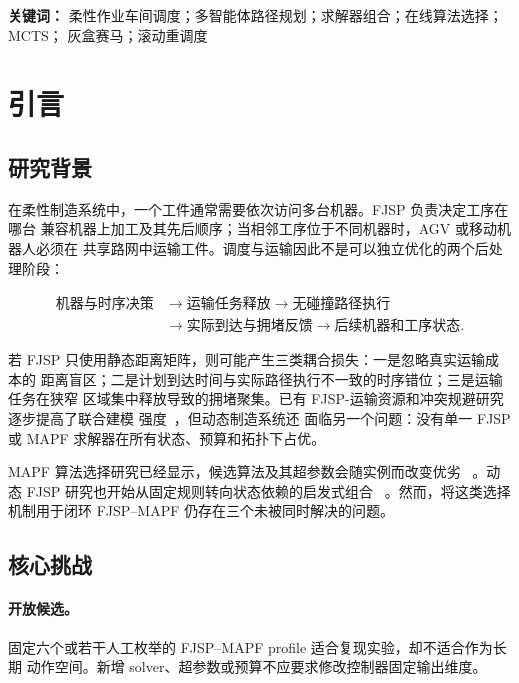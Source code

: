 \documentclass[11pt,a4paper]{article}
\begin{document}
\noindent\textbf{关键词：}
柔性作业车间调度；多智能体路径规划；求解器组合；在线算法选择；MCTS；
灰盒赛马；滚动重调度

\section{引言}
\label{sec:introduction}

\subsection{研究背景}

在柔性制造系统中，一个工件通常需要依次访问多台机器。FJSP 负责决定工序在哪台
兼容机器上加工及其先后顺序；当相邻工序位于不同机器时，AGV 或移动机器人必须在
共享路网中运输工件。调度与运输因此不是可以独立优化的两个后处理阶段：

\begin{equation}
\begin{aligned}
    \text{机器与时序决策}
    &\rightarrow
    \text{运输任务释放}
    \rightarrow
    \text{无碰撞路径执行}\\
    &\rightarrow
    \text{实际到达与拥堵反馈}
    \rightarrow
    \text{后续机器和工序状态}.
\end{aligned}
\end{equation}

若 FJSP 只使用静态距离矩阵，则可能产生三类耦合损失：一是忽略真实运输成本的
距离盲区；二是计划到达时间与实际路径执行不一致的时序错位；三是运输任务在狭窄
区域集中释放导致的拥堵聚集。已有 FJSP-运输资源和冲突规避研究逐步提高了联合建模
强度~\citep{berterottiere2024fjsptransport,sun2023integrated}，但动态制造系统还
面临另一个问题：没有单一 FJSP 或 MAPF 求解器在所有状态、预算和拓扑下占优。

MAPF 算法选择研究已经显示，候选算法及其超参数会随实例而改变优劣
~\citep{ren2021mapfast,alkazzi2022mapfaster,chen2024nopanacea,
shabalin2024mag}。动态 FJSP 研究也开始从固定规则转向状态依赖的启发式组合
~\citep{chen2025dyromcts,huang2026dsevolve}。然而，将这类选择机制用于闭环
FJSP--MAPF 仍存在三个未被同时解决的问题。

\subsection{核心挑战}

\paragraph{开放候选。}
固定六个或若干人工枚举的 FJSP--MAPF profile 适合复现实验，却不适合作为长期
动作空间。新增 solver、超参数或预算不应要求修改控制器固定输出维度。
\end{document}
